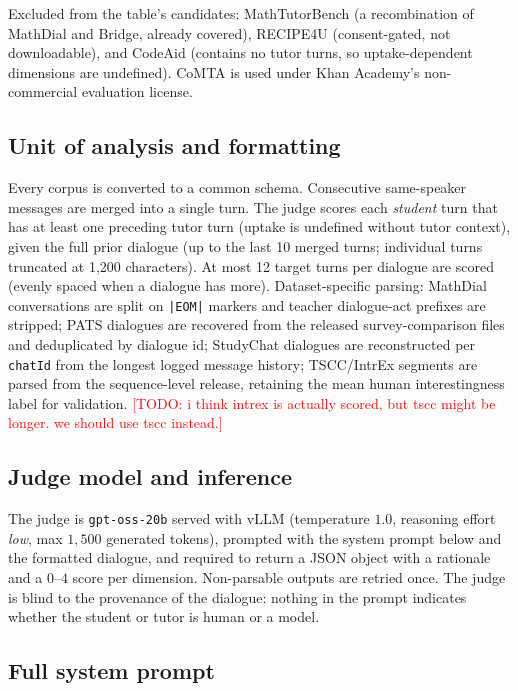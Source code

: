 \documentclass[11pt]{article}
\newcommand{\todo}[1]{\textcolor{red}{[TODO: #1]}}
\begin{document}
Excluded from the table's candidates: MathTutorBench (a recombination of
MathDial and Bridge, already covered), RECIPE4U (consent-gated, not
downloadable), and CodeAid (contains no tutor turns, so uptake-dependent
dimensions are undefined). CoMTA is used under Khan Academy's non-commercial
evaluation license.

\subsection{Unit of analysis and formatting}
Every corpus is converted to a common schema. Consecutive same-speaker
messages are merged into a single turn. The judge scores each
\emph{student} turn that has at least one preceding tutor turn (uptake is
undefined without tutor context), given the full prior dialogue (up to the
last 10 merged turns; individual turns truncated at 1{,}200 characters). At
most 12 target turns per dialogue are scored (evenly spaced when a dialogue
has more). Dataset-specific parsing: MathDial conversations are split on
\texttt{|EOM|} markers and teacher dialogue-act prefixes are stripped; PATS
dialogues are recovered from the released survey-comparison files and
deduplicated by dialogue id; StudyChat dialogues are reconstructed per
\texttt{chatId} from the longest logged message history; TSCC/IntrEx
segments are parsed from the sequence-level release, retaining the mean
human interestingness label for validation.
\todo{i think intrex is actually scored, but tscc might be longer. we should use tscc instead.}

\subsection{Judge model and inference}
The judge is \texttt{gpt-oss-20b} served with vLLM (temperature $1.0$,
reasoning effort \emph{low}, max $1{,}500$ generated tokens), prompted with
the system prompt below and the formatted dialogue, and required to return a
JSON object with a rationale and a $0$--$4$ score per dimension.
Non-parsable outputs are retried once. The judge is blind to the provenance
of the dialogue: nothing in the prompt indicates whether the student or
tutor is human or a model.

\subsection{Full system prompt}
\label{app:judge-prompt}
\end{document}
